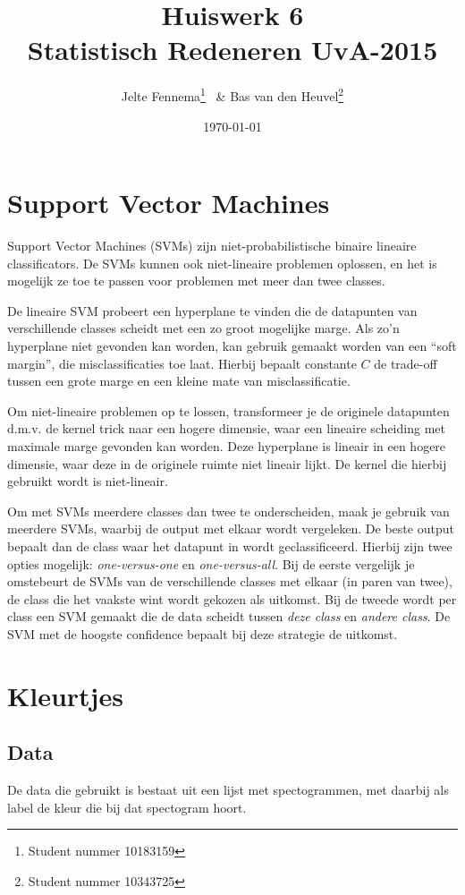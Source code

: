 \documentclass{article}
\title{Huiswerk 6\\ \large{Statistisch Redeneren UvA-2015}}
\author{Jelte Fennema\thanks{Student nummer 10183159} ~\& Bas van den
Heuvel\thanks{Student nummer 10343725}}
\date{\today}
\begin{document}
\maketitle

\section{Support Vector Machines}
Support Vector Machines (SVMs) zijn niet-probabilistische binaire lineaire
classificators. De SVMs kunnen ook niet-lineaire problemen oplossen, en het is
mogelijk ze toe te passen voor problemen met meer dan twee classes.

De lineaire SVM probeert een hyperplane te vinden die de datapunten van
verschillende classes scheidt met een zo groot mogelijke marge. Als zo'n
hyperplane niet gevonden kan worden, kan gebruik gemaakt worden van een ``soft
margin'', die misclassificaties toe laat. Hierbij bepaalt constante $C$ de
trade-off tussen een grote marge en een kleine mate van misclassificatie.

Om niet-lineaire problemen op te lossen, transformeer je de originele datapunten
d.m.v. de kernel trick naar een hogere dimensie, waar een lineaire scheiding met
maximale marge gevonden kan worden. Deze hyperplane is lineair in een hogere
dimensie, waar deze in de originele ruimte niet lineair lijkt. De kernel die
hierbij gebruikt wordt is niet-lineair.

Om met SVMs meerdere classes dan twee te onderscheiden, maak je gebruik van
meerdere SVMs, waarbij de output met elkaar wordt vergeleken. De beste output
bepaalt dan de class waar het datapunt in wordt geclassificeerd. Hierbij zijn
twee opties mogelijk: \textit{one-versus-one} en \textit{one-versus-all}. Bij de
eerste vergelijk je omstebeurt de SVMs van de verschillende classes met elkaar
(in paren van twee), de class die het vaakste wint wordt gekozen als uitkomst.
Bij de tweede wordt per class een SVM gemaakt die de data scheidt tussen
\textit{deze class} en \textit{andere class}. De SVM met de hoogste confidence
bepaalt bij deze strategie de uitkomst.

\section{Kleurtjes}

\subsection{Data}
De data die gebruikt is bestaat uit een lijst met spectogrammen, met daarbij als
label de kleur die bij dat spectogram hoort.
\end{document}
